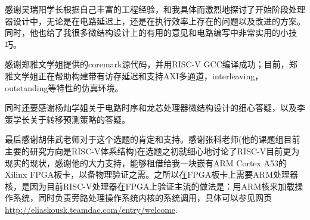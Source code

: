 
感谢吴瑞阳学长根据自己丰富的工程经验，和我具体而激烈地探讨了开始阶段处理器设计中，无论是在电路延迟上，还是在执行效率上存在的问题以及改进的方案。同时，他也给了我很多微结构设计上的有用的意见和电路编写中非常实用的小技巧。

感谢郑雅文学姐提供的coremark源代码，并用RISC-V GCC编译成功；目前，郑雅文学姐正在帮助构建带有访存延迟和支持AXI多通道，interleaving，outstanding等特性的仿真环境。

同时还要感谢杨灿学姐关于电路时序和龙芯处理器微结构设计的细心答疑，以及李策学长关于转移预测策略的答疑。

最后感谢胡伟武老师对于这个选题的肯定和支持。感谢张科老师(他的课题组目前主要的研究方向是RISC-V体系结构)在选题之初就细心地讨论了RISC-V目前更为现实的现状，感谢他的大力支持，能够租借给我一块嵌有ARM Cortex A53的Xilinx FPGA板卡，以备物理验证之需。之所以在FPGA板卡上需要ARM处理器核，是因为目前RISC-V处理器在FPGA上验证主流的做法是：用ARM核来加载操作系统，同时负责旁路处理操作系统内核的系统调用，具体可以参见网页\url{http://eliaskousk.teamdac.com/entry/welcome}.

\cleardoublepage[plain]%

